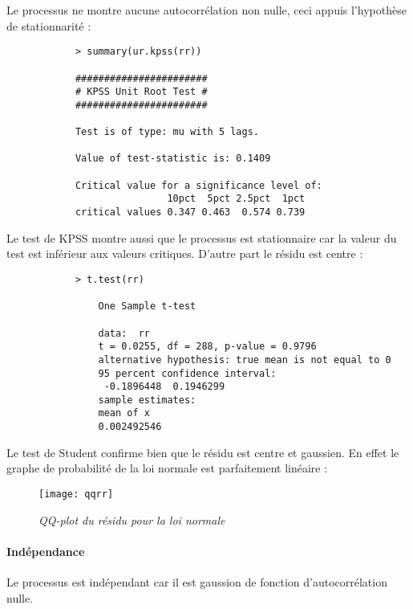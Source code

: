             Le processus ne montre aucune autocorrélation non nulle, ceci appuis
            l'hypothèse de stationnarité :
            \begin{verbatim}
            > summary(ur.kpss(rr))

            ####################### 
            # KPSS Unit Root Test # 
            ####################### 

            Test is of type: mu with 5 lags. 

            Value of test-statistic is: 0.1409 

            Critical value for a significance level of: 
                            10pct  5pct 2.5pct  1pct
            critical values 0.347 0.463  0.574 0.739
            \end{verbatim}
            Le test de KPSS montre aussi que le processus est stationnaire car
            la valeur du test est inférieur aux valeurs critiques. D'autre part
            le résidu est centre :
            \begin{verbatim}
            > t.test(rr)

                One Sample t-test

                data:  rr
                t = 0.0255, df = 288, p-value = 0.9796
                alternative hypothesis: true mean is not equal to 0
                95 percent confidence interval:
                 -0.1896448  0.1946299
                sample estimates:
                mean of x 
                0.002492546 
            \end{verbatim}
            Le test de Student confirme bien que le résidu est centre et
            gaussien. En effet le graphe de probabilité de la loi normale est
            parfaitement linéaire :
            \begin{figure}[H]
                \centering 
                \label{fig:qqrr} 
                \texttt{[image: qqrr]} 
                \caption{\it QQ-plot du résidu pour la loi normale } 
            \end{figure} 

            \paragraph{Indépendance}
            Le processus est indépendant car il est gaussion de fonction
            d'autocorrélation nulle.
